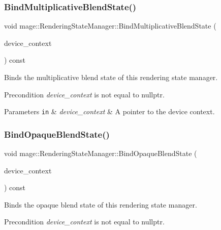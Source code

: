 \subsubsection{\texorpdfstring{Bind\+Multiplicative\+Blend\+State()}{BindMultiplicativeBlendState()}}
{\footnotesize\ttfamily void mage\+::\+Rendering\+State\+Manager\+::\+Bind\+Multiplicative\+Blend\+State (\begin{DoxyParamCaption}\item[{I\+D3\+D11\+Device\+Context4 $\ast$}]{device\+\_\+context }\end{DoxyParamCaption}) const\hspace{0.3cm}{\ttfamily [noexcept]}}

Binds the multiplicative blend state of this rendering state manager.

\begin{DoxyPrecond}{Precondition}
{\itshape device\+\_\+context} is not equal to {\ttfamily nullptr}. 
\end{DoxyPrecond}

\begin{DoxyParams}[1]{Parameters}
\mbox{\tt in}  & {\em device\+\_\+context} & A pointer to the device context. \\
\hline
\end{DoxyParams}
\hypertarget{classmage_1_1_rendering_state_manager_aa69d0694e8ebda3ba165a86bd1e61930}{}\label{classmage_1_1_rendering_state_manager_aa69d0694e8ebda3ba165a86bd1e61930} 
\subsubsection{\texorpdfstring{Bind\+Opaque\+Blend\+State()}{BindOpaqueBlendState()}}
{\footnotesize\ttfamily void mage\+::\+Rendering\+State\+Manager\+::\+Bind\+Opaque\+Blend\+State (\begin{DoxyParamCaption}\item[{I\+D3\+D11\+Device\+Context4 $\ast$}]{device\+\_\+context }\end{DoxyParamCaption}) const\hspace{0.3cm}{\ttfamily [noexcept]}}

Binds the opaque blend state of this rendering state manager.

\begin{DoxyPrecond}{Precondition}
{\itshape device\+\_\+context} is not equal to {\ttfamily nullptr}. 
\end{DoxyPrecond}

